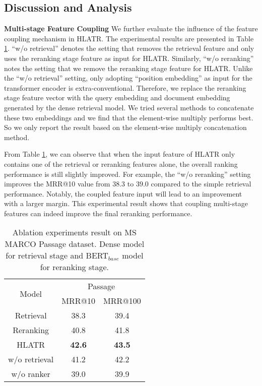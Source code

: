 \documentclass[11pt]{article}
\begin{document}
\subsection{Discussion and Analysis}
\label{sec:discussion}

\noindent \textbf{Multi-stage Feature Coupling} We further evaluate the influence of the feature coupling mechanism in HLATR. The experimental results are presented in Table \ref{tab:ablation}. ``w/o retrieval'' denotes the setting that removes the retrieval feature and only uses the reranking stage feature as input for HLATR. Similarly, ``w/o reranking'' notes the setting that we remove the reranking stage feature for HLATR. Unlike the ``w/o retrieval'' setting, only adopting ``position embedding'' as input for the transformer encoder is extra-conventional. Therefore, we replace the reranking stage feature vector with the query embedding and document embedding generated by the dense retrieval model. We tried several methods to concatenate these two embeddings and we find that the element-wise multiply performs best. So we only report the result based on the element-wise multiply concatenation method. 

From Table \ref{tab:ablation}, we can observe that when the input feature of HLATR only contains one of the retrieval or reranking features alone, the overall ranking performance is still slightly improved. For example, the ``w/o reranking'' setting improves the MRR@10 value from $38.3$ to $39.0$ compared to the simple retrieval performance. Notably, the coupled feature input will lead to an improvement with a larger margin. This experimental result shows that coupling multi-stage features can indeed improve the final reranking performance.

\begin{table}[]
\centering
\caption{Ablation experiments result on MS MARCO Passage dataset. Dense model for retrieval stage and BERT$_{base}$ model for reranking stage.}
\label{tab:ablation}
\begin{tabular}{@{}c|cc@{}}
\toprule
\multirow{2}{*}{Model} & \multicolumn{2}{c}{Passage} \\ \cmidrule(l){2-3} 
                       & MRR@10       & MRR@100      \\ \midrule
Retrieval              & 38.3         & 39.4         \\
Reranking                 & 40.8         & 41.8         \\
HLATR                   & {\bf 42.6}         & {\bf 43.5}         \\
w/o retrieval      & 41.2         & 42.2         \\
w/o ranker         & 39.0         & 39.9         \\
 \bottomrule
\end{tabular}
\end{table}
\end{document}
